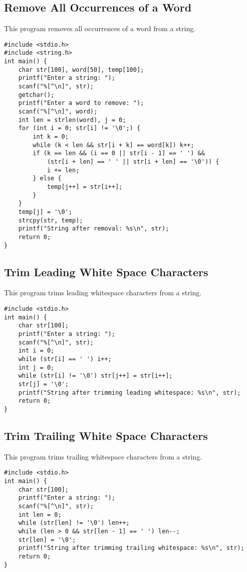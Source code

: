 \documentclass[a4paper,12pt]{article}
\begin{document}
\subsection{Remove All Occurrences of a Word}
This program removes all occurrences of a word from a string.
\begin{lstlisting}[caption={Remove All Occurrences of a Word}]
#include <stdio.h>
#include <string.h>
int main() {
    char str[100], word[50], temp[100];
    printf("Enter a string: ");
    scanf("%[^\n]", str);
    getchar();
    printf("Enter a word to remove: ");
    scanf("%[^\n]", word);
    int len = strlen(word), j = 0;
    for (int i = 0; str[i] != '\0';) {
        int k = 0;
        while (k < len && str[i + k] == word[k]) k++;
        if (k == len && (i == 0 || str[i - 1] == ' ') && 
            (str[i + len] == ' ' || str[i + len] == '\0')) {
            i += len;
        } else {
            temp[j++] = str[i++];
        }
    }
    temp[j] = '\0';
    strcpy(str, temp);
    printf("String after removal: %s\n", str);
    return 0;
}
\end{lstlisting}
\clearpage

\subsection{Trim Leading White Space Characters}
This program trims leading whitespace characters from a string.
\begin{lstlisting}[caption={Trim Leading White Space Characters}]
#include <stdio.h>
int main() {
    char str[100];
    printf("Enter a string: ");
    scanf("%[^\n]", str);
    int i = 0;
    while (str[i] == ' ') i++;
    int j = 0;
    while (str[i] != '\0') str[j++] = str[i++];
    str[j] = '\0';
    printf("String after trimming leading whitespace: %s\n", str);
    return 0;
}
\end{lstlisting}
\clearpage

\subsection{Trim Trailing White Space Characters}
This program trims trailing whitespace characters from a string.
\begin{lstlisting}[caption={Trim Trailing White Space Characters}]
#include <stdio.h>
int main() {
    char str[100];
    printf("Enter a string: ");
    scanf("%[^\n]", str);
    int len = 0;
    while (str[len] != '\0') len++;
    while (len > 0 && str[len - 1] == ' ') len--;
    str[len] = '\0';
    printf("String after trimming trailing whitespace: %s\n", str);
    return 0;
}
\end{lstlisting}
\clearpage
\end{document}
